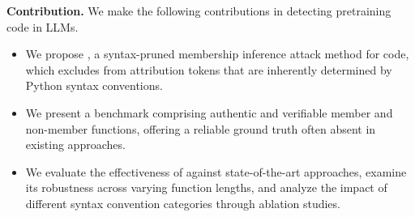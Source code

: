 
\textbf{Contribution.} We make the following contributions in detecting pretraining code in LLMs. 

\begin{itemize}
    \item We propose \tool, a syntax-pruned membership inference attack method for code, which excludes from attribution tokens that are inherently determined by Python syntax conventions.
    \item We present a benchmark comprising authentic and verifiable member and non-member functions, offering a reliable ground truth often absent in existing approaches.
    \item We evaluate the effectiveness of \tool against state-of-the-art approaches, examine its robustness across varying function lengths, and analyze the impact of different syntax convention categories through ablation studies.
\end{itemize}








